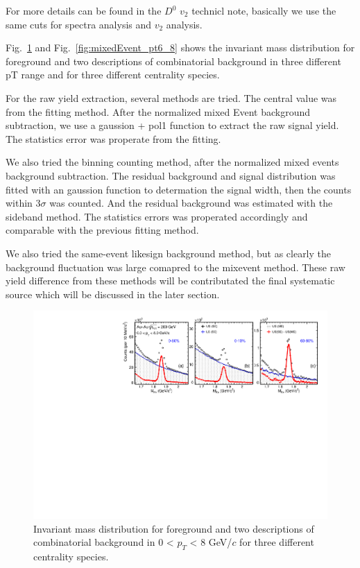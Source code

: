 For more details can be found in the $D^0$ $v_2$ technicl note, basically we use the same cuts for spectra analysis and $v_2$ analysis.

Fig.~\ref{fig:mixedEvent_pt0_8} and Fig.~\ref{fig:mixedEvent_pt6_8} shows the invariant mass distribution for foreground and two descriptions of combinatorial background in three different pT range and for three different centrality species.

For the raw yield extraction, several methods are tried. The central value was from the fitting method. After the normalized mixed Event background subtraction, we use a gaussion + pol1 function to extract the raw signal yield. The statistics error was properate from the fitting. 

We also tried the binning counting method, after the normalized mixed events background subtraction. The residual background and signal distribution was fitted with an gaussion function to determation the signal width, then the counts within 3$\sigma$ was counted. And the residual background was estimated with the sideband method. The statistics errors was properated accordingly and comparable with the previous fitting method.

We also tried the same-event likesign background method, but as clearly the background fluctuation was large comapred to the mixevent method. These raw yield difference from these methods will be contributated the final systematic source which will be discussed in the later section.


\begin{figure}[htbp]
\centering
\includegraphics[keepaspectratio,width=1.0\textwidth]{figure/Run14_D0HFT/signal_0_8GeV.pdf}
\caption{Invariant mass distribution for foreground and two descriptions of combinatorial background in 0 < $p_T$ < 8 GeV/$c$ for three different centrality species.}
\label{fig:mixedEvent_pt0_8}
\end{figure}

